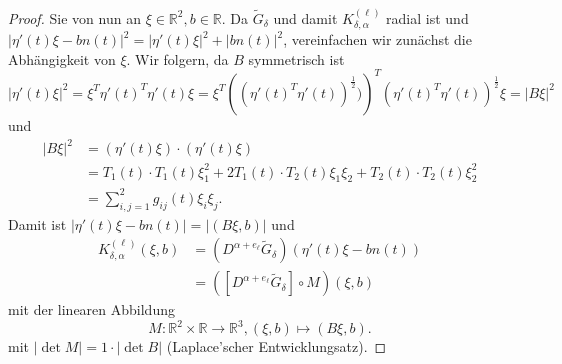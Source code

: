 \documentclass[12pt,a4paper]{scrartcl}
\numberwithin{equation}{section}
\newcommand{\R}{\mathbb{R}} %
\begin{document}
\begin{proof}
Sie von nun an $\xi \in \R^2, b\in \R$. Da $\widetilde G_\delta$ und damit $K_{\delta,\alpha}^{(\ell)}$ radial ist und $|\eta'(t) \xi - b n(t)|^2= |\eta'(t)\xi|^2 + |b n(t)|^2$, vereinfachen wir zunächst die Abhängigkeit von $\xi$. 
Wir folgern, da $B$ symmetrisch ist
\[
|\eta'(t)\xi|^2=\xi^T \eta'(t)^T \eta'(t) \xi = \xi^T \left( (\eta'(t)^T \eta'(t))^\frac{1}{2}) \right)^T (\eta'(t)^T \eta'(t))^\frac{1}{2} \xi= |B \xi|^2
\]
und 
\begin{align*}
|B \xi|^2 
&= (\eta'(t) \xi) \cdot (\eta'(t) \xi) \\
&=T_1(t) \cdot T_1(t) \xi_1^2 +2 T_1(t) \cdot T_2(t) \xi_1 \xi_2 + T_2(t) \cdot T_2(t) \xi_2^2 \\
&= \sum_{i,j=1}^2 g_{ij}(t) \xi_i \xi_j.
\end{align*}
Damit ist $|\eta'(t)\xi-b n(t)|=|(B\xi,b)|$ und
\begin{align*}
K_{\delta,\alpha}^{(\ell)}(\xi,b) 
&= \left(D^{\alpha + e_\ell} \widetilde{G}_\delta\right)(\eta'(t) \xi - b n(t)) \\
&=\left([D^{\alpha + e_\ell} \widetilde{G}_\delta]  \circ M \right)(\xi,b)
\end{align*} 
mit der linearen Abbildung
\[
M:\R^2 \times \R \to \R^3, (\xi, b) \mapsto (B\xi , b).
\]
mit $|\det M| = 1 \cdot |\det B|$ (Laplace'scher Entwicklungsatz).


\end{proof}
\end{document}

